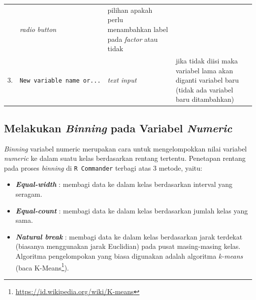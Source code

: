 \documentclass[12pt,]{krantz}
\providecommand{\tightlist}{%
  \setlength{\itemsep}{0pt}\setlength{\parskip}{0pt}}
\let\rmarkdownfootnote\footnote%
\def\footnote{\protect\rmarkdownfootnote}
\renewcommand{\href}[2]{#2\footnote{\url{#1}}}
\begin{document}
\begin{longtable}[]{@{}llll@{}}
\begin{minipage}[t]{0.15\columnwidth}
\end{minipage} & \begin{minipage}[t]{0.09\columnwidth}\raggedright
\emph{radio button}\strut
\end{minipage} & \begin{minipage}[t]{0.60\columnwidth}\raggedright
pilihan apakah perlu menambahkan label pada \emph{factor} atau tidak\strut
\end{minipage}\tabularnewline
\begin{minipage}[t]{0.04\columnwidth}\raggedright
3.\strut
\end{minipage} & \begin{minipage}[t]{0.15\columnwidth}\raggedright
\texttt{New\ variable\ name\ or...}\strut
\end{minipage} & \begin{minipage}[t]{0.09\columnwidth}\raggedright
\emph{text input}\strut
\end{minipage} & \begin{minipage}[t]{0.60\columnwidth}\raggedright
jika tidak diisi maka variabel lama akan diganti variabel baru (tidak ada variabel baru ditambahkan)\strut
\end{minipage}\tabularnewline
\bottomrule
\end{longtable}

\hypertarget{melakukan-binning-pada-variabel-numeric}{%
\subsection{\texorpdfstring{Melakukan \emph{Binning} pada Variabel \emph{Numeric}}{Melakukan Binning pada Variabel Numeric}}\label{melakukan-binning-pada-variabel-numeric}}

\emph{Binning} variabel numeric merupakan cara untuk mengelompokkan nilai variabel \emph{numeric} ke dalam suatu kelas berdasarkan rentang tertentu. Penetapan rentang pada proses \emph{binning} di \texttt{R\ Commander} terbagi atas 3 metode, yaitu:

\begin{itemize}
\tightlist
\item
  \textbf{\emph{Equal-width}} : membagi data ke dalam kelas berdasarkan interval yang seragam.
\item
  \textbf{\emph{Equal-count}} : membagi data ke dalam kelas berdasarkan jumlah kelas yang sama.
\item
  \textbf{\emph{Natural break}} : membagi data ke dalam kelas berdasarkan jarak terdekat (biasanya menggunakan jarak Euclidian) pada pusat masing-masing kelas. Algoritma pengelompokan yang biasa digunakan adalah algoritma \emph{k-means} (baca \href{https://id.wikipedia.org/wiki/K-means}{K-Means}).
\end{itemize}
\end{document}
